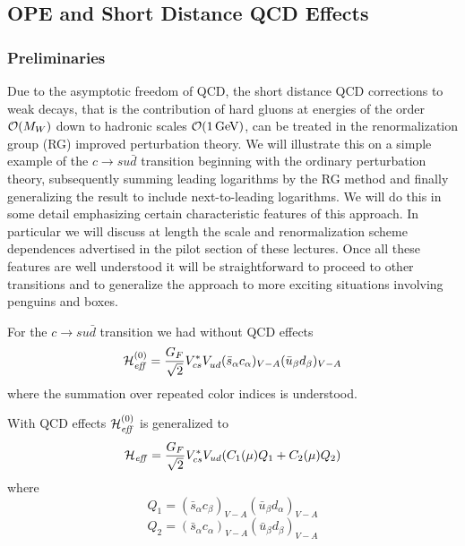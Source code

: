 \documentclass[12pt]{article}
\newcommand{\gev}{\, {\rm GeV}}
\newcommand{\ord}{{\cal O}}
\begin{document}
\begin{itemize}
\begin{itemize}
\begin{itemize}
\subsection{OPE and Short Distance QCD Effects}
            \label{sec:basicform:ope}
\subsubsection{Preliminaries}
Due to the asymptotic freedom of QCD, the short distance
QCD corrections to weak decays, that is the contribution
of hard gluons at energies of the order $\ord(M_W)$ down to hadronic
scales $\ord(1\gev)$, can be treated  in 
the renormalization group (RG) improved perturbation theory. 
We will illustrate this on a simple example of the
$c\to su\bar d$ transition beginning with the ordinary
perturbation theory, subsequently summing leading logarithms
by the RG method and finally generalizing the result to include
next-to-leading logarithms. We will do this in some detail
emphasizing certain characteristic features of this approach.
In particular we will discuss at length the scale and
renormalization scheme dependences advertised in the pilot
section of these lectures. Once all these features are well
understood it will be straightforward to proceed to other
transitions and to generalize the approach to more exciting
situations involving penguins and boxes.

For the $c\to su\bar d$ transition we had without QCD effects
\begin{equation}\label{amp0}
{\cal H}^{(0)}_{\it eff}={G_F\over\sqrt{2}}V^*_{cs}V_{ud}^{}
  (\bar s_\alpha c_\alpha)_{V-A}(\bar u_\beta d_\beta)_{V-A}
\end{equation}
where the summation over repeated color indices is understood.  

With QCD effects ${\cal H}^{(0)}_{\it eff}$ is generalized to
\begin{equation}\label{hq12}
{\cal H}_{\it eff}={G_F\over\sqrt{2}}V^\ast_{cs}V_{ud}
(C_1(\mu) Q_1+C_2(\mu) Q_2) 
\end{equation}
where
\begin{equation}\label{q1c} Q_1=
(\bar s_\alpha c_\beta)_{V-A}(\bar u_\beta d_\alpha)_{V-A}  
 \end{equation}
\begin{equation}\label{q2c} Q_2
=(\bar s_\alpha c_\alpha)_{V-A}(\bar u_\beta d_\beta)_{V-A}
  \end{equation}


\end{itemize}
\end{itemize}
\end{itemize}
\end{document}
